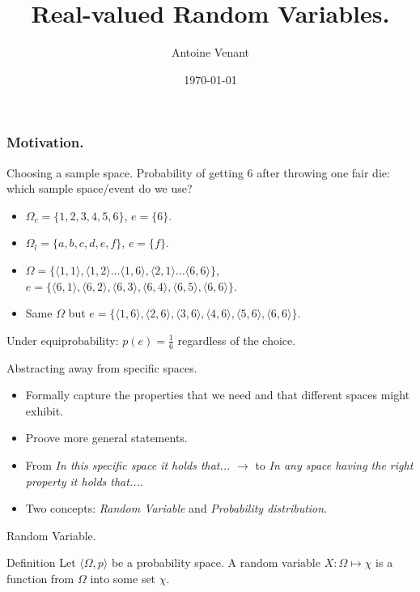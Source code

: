 \documentclass{beamer}
\begin{document}
\title{Real-valued Random Variables.} 
\author{Antoine Venant}
\date{\today}
\maketitle

\begin{frame}
  \frametitle{Motivation.}

  \begin{exampleblock}{Choosing a sample space.}
    Probability of getting $6$ after throwing one fair die: which sample space/event do we use?
    \begin{itemize}
    \item $\Omega_c = \{1,2,3,4,5,6\}$, $e = \{6\}$.
    \item $\Omega_l = \{a,b,c,d,e,f\}$, $e = \{f\}$.
    \item $\Omega = \{\langle 1,1 \rangle, \langle 1,2 \rangle \dots \langle 1,6 \rangle, \langle 2,1 \rangle \dots \langle 6,6 \rangle\}$, $e = \{\langle 6,1 \rangle, \langle 6,2 \rangle, \langle 6,3 \rangle, \langle 6,4 \rangle, \langle 6,5 \rangle, \langle 6,6 \rangle \}$.
    \item Same $\Omega$ but $e = \{\langle 1,6 \rangle, \langle 2,6 \rangle, \langle 3,6 \rangle, \langle 4,6 \rangle, \langle 5,6 \rangle,\langle 6,6 \rangle\}$.
    \end{itemize}
    Under equiprobability: $p(e) = \frac{1}{6}$ regardless of the choice.
  \end{exampleblock}
\end{frame}

\begin{frame}{Abstracting away from specific spaces.}
  \begin{itemize}
  \item Formally capture the properties that we need and that different spaces might exhibit.
  \item Proove more general statements.
  \item From \emph{In this specific space it holds that...} $\rightarrow$ to \emph{In any space \emph{having the right property} it holds that...}.
  \item Two concepts: \emph{Random Variable} and \emph{Probability distribution}.
  \end{itemize}
\end{frame}

\begin{frame}{Random Variable.}
  \begin{block}{Definition}
    Let $\langle \Omega, p \rangle$ be a probability space. A random variable $X: \Omega \mapsto \chi$ is a function from $\Omega$ into some set $\chi$. 
  \end{block}
\end{frame}
\end{document}
